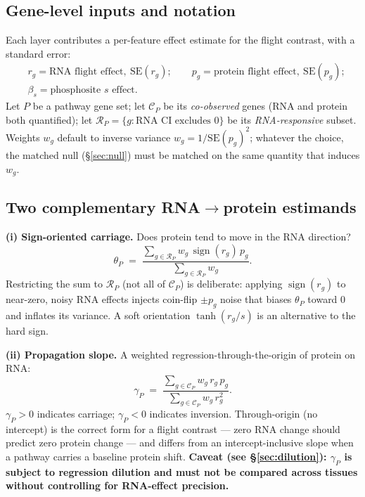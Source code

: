 \documentclass[11pt]{article}
\begin{document}
\subsection{Gene-level inputs and notation}
Each layer contributes a per-feature effect estimate for the flight contrast, with a standard error:
\[
\begin{aligned}
&r_g = \text{RNA flight effect},\ \mathrm{SE}(r_g); \qquad
p_g = \text{protein flight effect},\ \mathrm{SE}(p_g);\\[2pt]
&\beta_{s} = \text{phosphosite $s$ effect}.
\end{aligned}
\]
Let $P$ be a pathway gene set; let $\mathcal{C}_P$ be its \emph{co-observed} genes (RNA and protein both
quantified); let $\mathcal{R}_P=\{g:\text{RNA CI excludes }0\}$ be its \emph{RNA-responsive} subset. Weights
$w_g$ default to inverse variance $w_g = 1/\mathrm{SE}(p_g)^2$; whatever the choice, the matched null
(\S\ref{sec:null}) must be matched on the same quantity that induces $w_g$.

\subsection{Two complementary RNA$\rightarrow$protein estimands}
\textbf{(i) Sign-oriented carriage.} Does protein tend to move in the RNA direction?
\begin{equation}
\theta_P \;=\; \frac{\sum_{g\in \mathcal{R}_P} w_g\,\operatorname{sign}(r_g)\,p_g}{\sum_{g\in \mathcal{R}_P} w_g}.
\label{eq:theta}
\end{equation}
Restricting the sum to $\mathcal{R}_P$ (not all of $\mathcal{C}_P$) is deliberate: applying
$\operatorname{sign}(r_g)$ to near-zero, noisy RNA effects injects coin-flip $\pm p_g$ noise that biases
$\theta_P$ toward $0$ and inflates its variance. A soft orientation $\tanh(r_g/s)$ is an alternative to the
hard sign.

\smallskip\noindent\textbf{(ii) Propagation slope.} A weighted regression-through-the-origin of protein on RNA:
\begin{equation}
\gamma_P \;=\; \frac{\sum_{g\in \mathcal{C}_P} w_g\, r_g\, p_g}{\sum_{g\in \mathcal{C}_P} w_g\, r_g^{2}}.
\label{eq:gamma}
\end{equation}
$\gamma_P>0$ indicates carriage; $\gamma_P<0$ indicates inversion. Through-origin (no intercept) is the
correct form for a flight contrast --- zero RNA change should predict zero protein change --- and differs
from an intercept-inclusive slope when a pathway carries a baseline protein shift. \textbf{Caveat (see
\S\ref{sec:dilution}): $\gamma_P$ is subject to regression dilution and must not be compared across tissues
without controlling for RNA-effect precision.}
\end{document}
